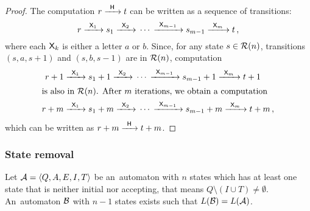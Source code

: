 \begin{proof}
    The computation $r {\; \xrightarrow[]{\: \; {\mathsf{H}} \: \;} \;} t$ can be written as a sequence of transitions:
    \[
        r {\; \xrightarrow[]{\: \; {\mathsf{X}}_1 \: \;} \;} s_1 {\; \xrightarrow[]{\: \; {\mathsf{X}}_2 \: \;} \;} \dotsb {\; \xrightarrow[]{\: \; {\mathsf{X}}_{m-1} \: \;} \;} s_{m-1} {\; \xrightarrow[]{\: \; {\mathsf{X}}_m \: \;} \;} t \, ,
    \]
    where each ${\mathsf{X}}_k$ is either a letter $a$ or $b$. Since, for any state $s \in {\mathcal{R}}(n)$, transitions $(s, a, s+1)$ and $(s, b, s-1)$ are in ${\mathcal{R}}(n)$, computation
    \begin{align*}
       r + 1 &{\; \xrightarrow[]{\: \; {\mathsf{X}}_1 \: \;} \;} s_1 + 1 {\; \xrightarrow[]{\: \; {\mathsf{X}}_2 \: \;} \;} \dotsb {\; \xrightarrow[]{\: \; {\mathsf{X}}_{m-1} \: \;} \;} s_{m-1} + 1 {\; \xrightarrow[]{\: \; {\mathsf{X}}_m \: \;} \;} t + 1 \\
    \intertext{is also in ${\mathcal{R}}(n)$. After $m$ iterations, we obtain a computation}
       r + m &{\; \xrightarrow[]{\: \; {\mathsf{X}}_1 \: \;} \;} s_1 + m {\; \xrightarrow[]{\: \; {\mathsf{X}}_2 \: \;} \;} \dotsb {\; \xrightarrow[]{\: \; {\mathsf{X}}_{m-1} \: \;} \;} s_{m-1} + m {\; \xrightarrow[]{\: \; {\mathsf{X}}_m \: \;} \;} t + m \, ,
    \end{align*}
    which can be written as $r+m {\; \xrightarrow[]{\: \; {\mathsf{H}} \: \;} \;} t+m$.
\end{proof}

\subsubsection*{State removal }

\begin{lemma}\label{lm:state_removal_lemma}
    Let ${\mathcal{A}} = \langle Q, A, E, I, T \rangle$ be an~automaton with $n$ states which has at least one state that is neither initial nor accepting, that means $Q \setminus (I \cup T) \neq \emptyset$. An~automaton ${\mathcal{B}}$ with $n - 1$ states exists such that $L({\mathcal{B}}) = L({\mathcal{A}})$.
\end{lemma}

